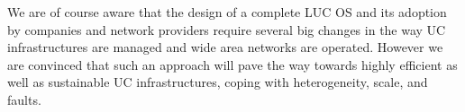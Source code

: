 We are of course aware that the design of a complete LUC OS and its adoption by
companies and network providers require several big changes in the way UC
infrastructures are managed and wide area networks are operated. However we are
convinced that such an approach will pave the way towards highly efficient as
well as sustainable UC infrastructures, coping with heterogeneity, scale, and
faults. 


